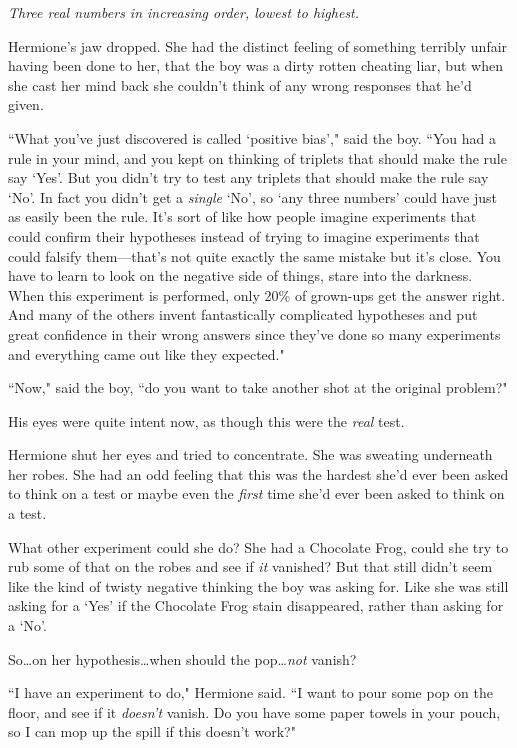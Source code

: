 \emph{Three real numbers in increasing order, lowest to highest.}

Hermione's jaw dropped. She had the distinct feeling of something terribly unfair having been done to her, that the boy was a dirty rotten cheating liar, but when she cast her mind back she couldn't think of any wrong responses that he'd given.

``What you've just discovered is called `positive bias'," said the boy. ``You had a rule in your mind, and you kept on thinking of triplets that should make the rule say `Yes'. But you didn't try to test any triplets that should make the rule say `No'. In fact you didn't get a \emph{single} `No', so `any three numbers' could have just as easily been the rule. It's sort of like how people imagine experiments that could confirm their hypotheses instead of trying to imagine experiments that could falsify them—that's not quite exactly the same mistake but it's close. You have to learn to look on the negative side of things, stare into the darkness. When this experiment is performed, only 20\% of grown-ups get the answer right. And many of the others invent fantastically complicated hypotheses and put great confidence in their wrong answers since they've done so many experiments and everything came out like they expected."

``Now," said the boy, ``do you want to take another shot at the original problem?"

His eyes were quite intent now, as though this were the \emph{real} test.

Hermione shut her eyes and tried to concentrate. She was sweating underneath her robes. She had an odd feeling that this was the hardest she'd ever been asked to think on a test or maybe even the \emph{first} time she'd ever been asked to think on a test.

What other experiment could she do? She had a Chocolate Frog, could she try to rub some of that on the robes and see if \emph{it} vanished? But that still didn't seem like the kind of twisty negative thinking the boy was asking for. Like she was still asking for a `Yes' if the Chocolate Frog stain disappeared, rather than asking for a `No'.

So…on her hypothesis…when should the pop…\emph{not} vanish?

``I have an experiment to do," Hermione said. ``I want to pour some pop on the floor, and see if it \emph{doesn't} vanish. Do you have some paper towels in your pouch, so I can mop up the spill if this doesn't work?"

